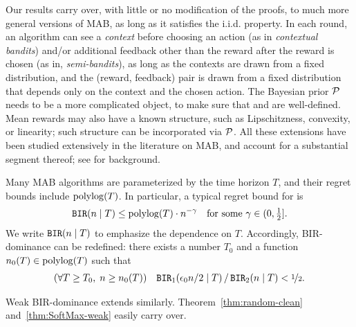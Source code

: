  Our results carry over, with little or no modification of the proofs, to much more general versions of MAB, as long as it satisfies the i.i.d. property. In each round, an algorithm can see a \emph{context} before choosing an action (as in \emph{contextual bandits}) and/or additional feedback other than the reward after the reward is chosen (as in, \eg \emph{semi-bandits}), as long as the contexts are drawn from a fixed distribution, and the (reward, feedback) pair is drawn from a fixed distribution that depends only on the context and the chosen action. The Bayesian prior $\mathcal{P}$ needs to be a more complicated object, to make sure that \PMR and \BIR are well-defined. Mean rewards may also have a known structure, such as Lipschitzness, convexity, or linearity; such structure can be incorporated via $\mathcal{P}$. All these extensions have been studied extensively in the literature on MAB, and account for a substantial segment thereof;
see \citep{slivkins-MABbook,LS19bandit-book} for background.



Many MAB algorithms are parameterized by the time horizon $T$, and their regret bounds include $\polylog(T)$. In particular,  a typical regret bound for \BIR is
\begin{align}
    \BIR(n\mid T)\leq \polylog(T)\cdot n^{-\gamma}
    \quad \text{for some $\gamma\in(0,\tfrac12]$}.
\end{align}
We write $\mathtt{BIR}(n\mid T)$ to emphasize the dependence on $T$. Accordingly, BIR-dominance can be redefined: there exists a number $T_0$ and a function $n_0(T)\in \polylog(T)$
such that
\begin{align}\label{eq:random-better-messy}
(\forall T\geq T_0,\; n\geq n_0(T)) \quad
\mathtt{BIR}_1(\epsilon_0 n /2\mid T)\,/\, \mathtt{BIR}_2(n\mid T) <\nicefrac12.
\end{align}

\noindent Weak BIR-dominance extends similarly.
Theorem~\ref{thm:random-clean} and~\ref{thm:SoftMax-weak} easily carry over.





